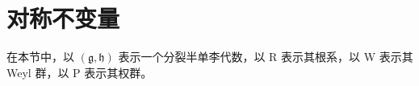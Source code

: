 \section{对称不变量}

在本节中，以 \((\mathfrak{g},\mathfrak{h})\) 表示一个分裂半单李代数，以 R 表示其根系，以 W 表示其 Weyl 群，以 P 表示其权群。

